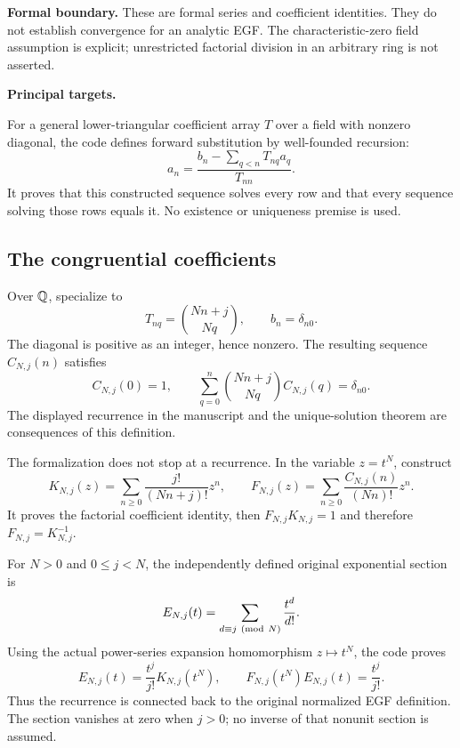 \textbf{Formal boundary.} These are formal series and coefficient identities. They do not establish convergence for an analytic EGF. The characteristic-zero field assumption is explicit; unrestricted factorial division in an arbitrary ring is not asserted.

\textbf{Principal targets.}\par
{}\par
{}\par
{}\par
{}
\par\medskip
{}
For a general lower-triangular coefficient array $T$ over a field with nonzero diagonal, the code defines forward substitution by well-founded recursion:
\[
 a_n=\frac{b_n-\sum_{q<n}T_{nq}a_q}{T_{nn}}.
\]
It proves that this constructed sequence solves every row and that every sequence solving those rows equals it. No existence or uniqueness premise is used.

\subsection*{The congruential coefficients}
Over $\mathbb Q$, specialize to
\[
 T_{nq}=\binom{Nn+j}{Nq},\qquad b_n=\delta_{n0}.
\]
The diagonal is positive as an integer, hence nonzero. The resulting sequence $C_{N,j}(n)$ satisfies
\[
 C_{N,j}(0)=1,\qquad
 \sum_{q=0}^{n}\binom{Nn+j}{Nq}C_{N,j}(q)=\delta_{n0}.
\]
The displayed recurrence in the manuscript and the unique-solution theorem are consequences of this definition.

The formalization does not stop at a recurrence. In the variable $z=t^N$, construct
\[
 K_{N,j}(z)=\sum_{n\ge0}\frac{j!}{(Nn+j)!}z^n,\qquad
 F_{N,j}(z)=\sum_{n\ge0}\frac{C_{N,j}(n)}{(Nn)!}z^n.
\]
It proves the factorial coefficient identity, then $F_{N,j}K_{N,j}=1$ and therefore $F_{N,j}=K_{N,j}^{-1}$.

For $N>0$ and $0\le j<N$, the independently defined original exponential section is
\[
 E_{N,j}(t)=\sum_{d\equiv j\ ({\rm mod}\ N)}\frac{t^d}{d!}.
\]
Using the actual power-series expansion homomorphism $z\mapsto t^N$, the code proves
\[
 E_{N,j}(t)=\frac{t^j}{j!}K_{N,j}(t^N),\qquad
 \boxed{F_{N,j}(t^N)E_{N,j}(t)=\frac{t^j}{j!}.}
\]
Thus the recurrence is connected back to the original normalized EGF definition. The section vanishes at zero when $j>0$; no inverse of that nonunit section is assumed.

